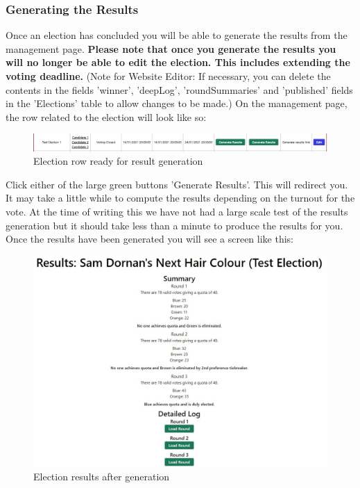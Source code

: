\documentclass{article}
\begin{document}
\subsubsection{Generating the Results}
Once an election has concluded you will be able to generate the results from the management page. \textbf{Please note that once you generate the results you will no longer be able to edit the election. This includes extending the voting deadline.} (Note for Website Editor: If necessary, you can delete the contents in the fields 'winner', 'deepLog', 'roundSummaries' and 'published' fields in the 'Elections' table to allow changes to be made.) On the management page, the row related to the election will look like so:
\begin{figure}[H]
    \centering
    \includegraphics[width=\textwidth,height=\textheight,keepaspectratio]{elections/election_row_generate.png}
    \caption{Election row ready for result generation}
    \label{fig:election_generation_ready}
\end{figure}
Click either of the large green buttons 'Generate Results'. This will redirect you. It may take a little while to compute the results depending on the turnout for the vote. At the time of writing this we have not had a large scale test of the results generation but it should take less than a minute to produce the results for you. Once the results have been generated you will see a screen like this:
\begin{figure}[H]
    \centering
    \includegraphics[width=\textwidth,height=\textheight,keepaspectratio]{elections/election_results.png}
    \caption{Election results after generation}
    \label{fig:election_results_generated}
\end{figure}
\end{document}

